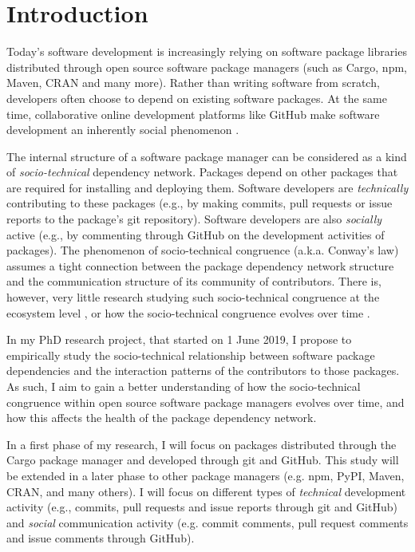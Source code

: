 \section{Introduction}
\label{sec:intro}

Today's software development is increasingly relying on software package libraries distributed through open source software package managers (such as Cargo, npm, Maven, CRAN and many more). Rather than writing software from scratch, developers often choose to depend on existing software packages.
At the same time, collaborative online development platforms like GitHub make software development an inherently social phenomenon \cite{DabbishSTH12,Mens2019IEEESW}.

The internal structure of a software package manager can be considered as a kind of \emph{socio-technical} dependency network. Packages depend on other packages that are required for installing and deploying them. Software developers are \emph{technically} contributing to these packages (e.g., by making commits, pull requests or issue reports to the package's git repository). Software developers are also \emph{socially} active (e.g., by commenting through GitHub on the development activities of packages).
The phenomenon of socio-technical congruence (a.k.a. Conway's law) \cite{Conway1968, Herbsleb1999} assumes a tight connection between the package dependency network structure and the communication structure of its community of contributors. There is, however, very little research studying such socio-technical congruence at the ecosystem level \cite{Palyart2018TSE}, or how the socio-technical congruence evolves over time \cite{Cataldo2008}.

In my PhD research project, that started on 1 June 2019, I propose to empirically study the socio-technical relationship between software package dependencies and the interaction patterns of the contributors to those packages.
As such, I aim to gain a better understanding of how the socio-technical congruence within open source software package managers evolves over time, and how this affects the health of the package dependency network.

In a first phase of my research, I will focus on packages distributed through the Cargo package manager and developed through git and GitHub. This study will be extended in a later phase to other package managers (e.g. npm, PyPI, Maven, CRAN, and many others).
I will focus on different types of \emph{technical} development activity (e.g., commits, pull requests and issue reports through git and GitHub) and \emph{social} communication activity (e.g. commit comments, pull request comments and issue comments through GitHub). 

